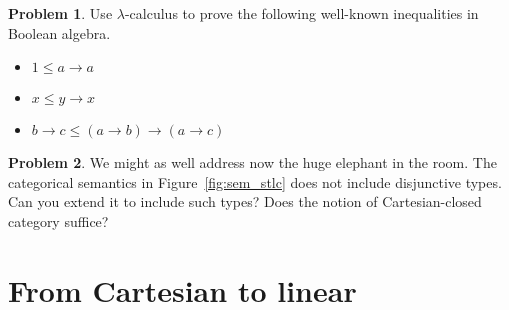 \documentclass[a4paper, 11pt]{article}
\theoremstyle{definition}
\newtheorem{problem}{Problem}
\begin{document}
\begin{problem}
        Use $\lambda$-calculus to prove the following well-known inequalities
        in Boolean algebra.
        \begin{itemize}
                \item $1 \leq a \to a$
                \item $x \leq y \to x$
                \item $b \to c \leq (a \to b) \to (a \to c)$

        \end{itemize}
\end{problem}

\begin{problem}
        We might as well address now the huge elephant in the room. The
        categorical semantics in Figure~\ref{fig:sem_stlc} does not include
        disjunctive types. Can you extend it to include such types? Does the
        notion of Cartesian-closed category suffice?
\end{problem}

\section{From Cartesian to linear}
\end{document}
